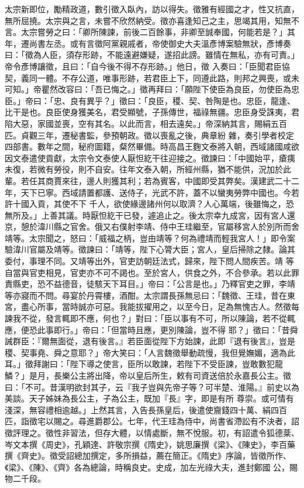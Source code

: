 \begin{pinyinscope}
 太宗新即位，勵精政道，數引徵入臥內，訪以得失。徵雅有經國之才，性又抗直，無所屈撓。太宗與之言，未嘗不欣然納受。徵亦喜逢知己之主，思竭其用，知無不言。太宗嘗勞之曰：「卿所陳諫，前後二百餘事，非卿至誠奉國，何能若是？」其年，遷尚書左丞。或有言徵阿黨親戚者，帝使御史大夫溫彥博案驗無狀，彥博奏曰：「徵為人臣，須存形跡，不能遠避嫌疑，遂招此謗。雖情在無私，亦有可責。」帝令彥博讓徵，且曰：「自今後不得不存形跡。」他日，徵
 入奏曰：「臣聞君臣協契，義同一體。不存公道，唯事形跡，若君臣上下，同遵此路，則邦之興喪，或未可知。」帝瞿然改容曰：「吾已悔之。」徵再拜曰：「願陛下使臣為良臣，勿使臣為忠臣。」帝曰：「忠、良有異乎？」徵曰：「良臣，稷、契、咎陶是也。忠臣，龍逢、比干是也。良臣使身獲美名，君受顯號，子孫傳世，福祿無疆。忠臣身受誅夷，君陷大惡，家國並喪，空有其名。以此而言，相去遠矣。」帝深納其言，賜絹五百匹。貞觀三年，遷秘書監，參預朝政。徵以喪亂之後，典章紛
 雜，奏引學者校定四部書。數年之間，秘府圖籍，粲然畢備。時高昌王麴文泰將入朝，西域諸國咸欲因文泰遣使貢獻，太宗令文泰使人厭怛紇干往迎接之。徵諫曰：「中國始平，瘡痍未復，若微有勞役，則不自安。往年文泰入朝，所經州縣，猶不能供，況加於此輩。若任其商賈來往，邊人則獲其利；若為賓客，中國即受其弊矣。漢建武二十二年，天下已寧。西域請置都護、送侍子，光武不許，蓋不以蠻夷勞弊中國也。今若許十國入貢，其使不下
 千人，欲使緣邊諸州何以取濟？人心萬端，後雖悔之，恐無所及。」上善其議。時厭怛紇干已發，遽追止之。後太宗幸九成宮，因有宮人還京，憩於湋川縣之官舍。俄又右僕射李靖、侍中王珪繼至，官屬移宮人於別所而舍靖等。太宗聞之，怒曰：「威福之柄，豈由靖等？何為禮靖而輕我宮人！」即令案驗湋川官屬及靖等。徵諫曰：「靖等，陛下心膂大臣；宮人，皇后掃除之隸。論其委付，事理不同。又靖等出外，官吏訪朝廷法式，歸來，陛下問人間疾苦。靖
 等自當與官吏相見，官吏亦不可不謁也。至於宮人，供食之外，不合參承。若以此罪責縣吏，恐不益德音，徒駭天下耳目。」帝曰：「公言是也。」乃釋官吏之罪，李靖等亦寢而不問。尋宴於丹霄樓，酒酣。太宗謂長孫無忌曰：「魏徵、王珪，昔在東宮，盡心所事，當時誠亦可惡。我能拔擢用之，以至今日，足為無愧古人。然徵每諫我不從，發言輒即不應，何也？」對曰：「臣以事有不可，所以陳論，若不從輒應，便恐此事即行。」帝曰：「但當時且應，更別陳論，豈不得
 耶？」徵曰：「昔舜誡群臣：『爾無面從，退有後言。』若臣面從陛下方始諫，此即『退有後言』，豈是稷、契事堯、舜之意耶？」帝大笑曰：「人言魏徵舉動疏慢，我但覺嫵媚，適為此耳。」徵拜謝曰：「陛下導之使言，臣所以敢諫，若陛下不受臣諫，豈敢數犯龍鱗？」是月，長樂公主將出降，帝以皇后所生，敕有司資送倍於永嘉長公主。徵曰：「不可。昔漢明欲封其子，云『我子豈與先帝子等？可半楚、淮陽。』前史以為美談。天子姊妹為長公主，子為公主，既加『長』字，即是有所
 尊崇。或可情有淺深，無容禮相逾越。」上然其言，入告長孫皇后，後遣使齎錢四十萬、絹四百匹，詣徵宅以賜之。尋進爵郡公。七年，代王珪為侍中，尚書省滯訟有不決者，詔徵評理之。徵性非習法，但存大體，以情處斷，無不悅服。初，有詔遣令狐德棻、岑文本撰《周史》，孔穎達、許敬宗撰《隋史》，姚思廉撰《梁》、《陳史》，李百藥撰《齊史》。徵受詔總加撰定，多所損益，薦在簡正。《隋史》序論，皆徵所作、《梁》、《陳》、《齊》各為總論，時稱良史。史成，加左光祿大夫，進封鄭國
 公，賜物二千段。




\end{pinyinscope}
